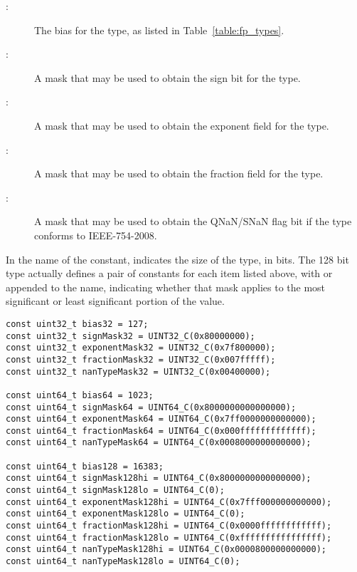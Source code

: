 \begin{description}
  \item[ :] The bias for the type, as listed in Table~\ref{table:fp_types}.
  \item[ :] A mask that may be used to obtain the sign bit for the type.
  \item[ :] A mask that may be used to obtain the exponent field for the type.
  \item[ :] A mask that may be used to obtain the fraction field for the type.
  \item[ :] A mask that may be used to obtain the QNaN/SNaN flag bit if the type conforms to IEEE-754-2008.
\end{description}

In the name of the constant,  indicates the size of the type, in bits. The 128 bit type actually defines a pair of constants for each item listed above, with  or  appended to the name, indicating whether that mask applies to the most significant or least significant portion of the value.

\noindent
\begin{minipage}{\linewidth}
\begin{singlespace}
\begin{lstlisting}[caption=Floating-point field masks., label=listing:framework_masks]
const uint32_t bias32 = 127;
const uint32_t signMask32 = UINT32_C(0x80000000);
const uint32_t exponentMask32 = UINT32_C(0x7f800000);
const uint32_t fractionMask32 = UINT32_C(0x007fffff);
const uint32_t nanTypeMask32 = UINT32_C(0x00400000);

const uint64_t bias64 = 1023;
const uint64_t signMask64 = UINT64_C(0x8000000000000000);
const uint64_t exponentMask64 = UINT64_C(0x7ff0000000000000);
const uint64_t fractionMask64 = UINT64_C(0x000fffffffffffff);
const uint64_t nanTypeMask64 = UINT64_C(0x0008000000000000);

const uint64_t bias128 = 16383;
const uint64_t signMask128hi = UINT64_C(0x8000000000000000);
const uint64_t signMask128lo = UINT64_C(0);
const uint64_t exponentMask128hi = UINT64_C(0x7fff000000000000);
const uint64_t exponentMask128lo = UINT64_C(0);
const uint64_t fractionMask128hi = UINT64_C(0x0000ffffffffffff);
const uint64_t fractionMask128lo = UINT64_C(0xffffffffffffffff);
const uint64_t nanTypeMask128hi = UINT64_C(0x0000800000000000);
const uint64_t nanTypeMask128lo = UINT64_C(0);
\end{lstlisting}
\end{singlespace}
\end{minipage}

